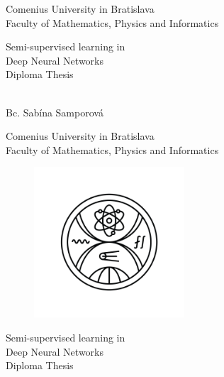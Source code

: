 \documentclass[12pt, twoside]{book}
\def\mfrok{2023}
\def\mfnazov{Semi-supervised learning in \\Deep Neural Networks}
\def\mftyp{Diploma Thesis}
\def\mfautor{Bc. Sabína Samporová}
\begin{document}
     
\frontmatter
\pagestyle{empty}


\begin{center}
  \sc\large
  Comenius University in Bratislava\\
  Faculty of Mathematics, Physics and Informatics
\end{center}



\vfill

\begin{center}
\sc\large
{\LARGE\mfnazov}\\
\mftyp
\end{center}

\vfill

{\sc\large 
\noindent \mfrok\\
\mfautor
}

\cleardoublepage


\noindent

\begin{center}
\sc  
\large
  Comenius University in Bratislava\\
  Faculty of Mathematics, Physics and Informatics
\end{center}

\vfill
\begin{figure}[h!]
    \centering
    \includegraphics[width=0.5\textwidth]{figs/FMFI_logo_BP.png}
\end{figure}

\vfill


\begin{center}
{\LARGE\mfnazov}\\
\mftyp
\end{center}
\end{document}
